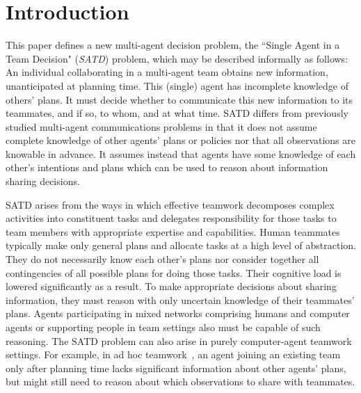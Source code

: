 

\section{Introduction}
\label{sec:intro}
This paper defines a new multi-agent decision problem, the ``Single Agent in a Team Decision" ({\em SATD}) problem, which may be described informally as follows: An individual collaborating in a multi-agent team obtains new information, unanticipated at planning time.  This (single) agent has incomplete knowledge of others' plans.  It must decide whether to communicate this new information to its teammates, and if so, to whom, and at what time.  SATD differs from previously studied multi-agent communications problems in that it does not assume complete knowledge of other agents' plans or policies nor that all observations are knowable in advance.  It assumes instead that agents have some knowledge of each other's intentions and plans which can be used to reason about information sharing decisions.  

SATD arises from the ways in which effective teamwork decomposes complex activities into constituent tasks and delegates responsibility for those tasks to team members with appropriate expertise and capabilities.  Human teammates typically make only general plans and allocate tasks at a high level of abstraction. They do not necessarily know each other's plans  nor consider together all contingencies of all possible plans for doing those tasks. Their cognitive load is lowered significantly as a result. 
To make appropriate decisions about sharing information, they must reason  with only uncertain knowledge of their teammates' plans. Agents participating in mixed networks comprising  humans and computer agents or supporting people in team settings also must be capable of such reasoning.  The SATD problem can also arise in purely computer-agent teamwork settings. For example, in ad hoc teamwork~\cite{stone2010ad}, an agent joining an existing team only after planning time  lacks significant information about other agents' plans, but might still need to reason about which observations to share with teammates. 

